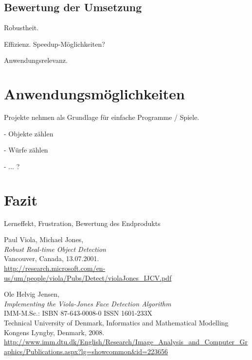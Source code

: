 \documentclass[12pt,a4paper,ngerman]{scrartcl}
\begin{document}
\subsection{Bewertung der Umsetzung}

Robustheit.

Effizienz. Speedup-Möglichkeiten?

Anwendungsrelevanz.

\section{Anwendungsmöglichkeiten}

Projekte nehmen als Grundlage für einfache Programme / Spiele.

- Objekte zählen

- Würfe zählen

- ... ?

\section{Fazit}

Lerneffekt, Frustration, Bewertung des Endprodukts


\newpage



\newpage
{}
{}
\renewcommand{\refname}{Quellen}

\begin{thebibliography}{99}

Paul Viola, Michael Jones,\\
{\em Robust Real-time Object Detection}\\
Vancouver, Canada, 13.07.2001.\\
\url{http://research.microsoft.com/en-us/um/people/viola/Pubs/Detect/violaJones_IJCV.pdf}

Ole Helvig Jensen,\\
{\em Implementing the Viola-Jones Face Detection Algorithm}\\
IMM-M.Sc.: ISBN 87-643-0008-0 \qquad ISSN 1601-233X\\
Technical University of Denmark, Informatics and Mathematical Modelling\\
Kongens Lyngby, Denmark, 2008.\\
\url{http://www.imm.dtu.dk/English/Research/Image_Analysis_and_Computer_Graphics/Publications.aspx?lg=showcommon&id=223656}

\end{thebibliography}
\end{document}
